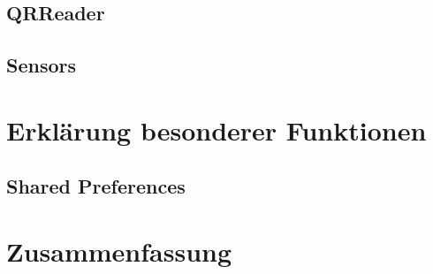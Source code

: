 \documentclass[11pt]{article} %
\begin{document}
\subsection{QRReader}

\subsection{Sensors}

\section{Erklärung besonderer Funktionen}

\subsection{Shared Preferences}

\section{Zusammenfassung}
\end{document}
